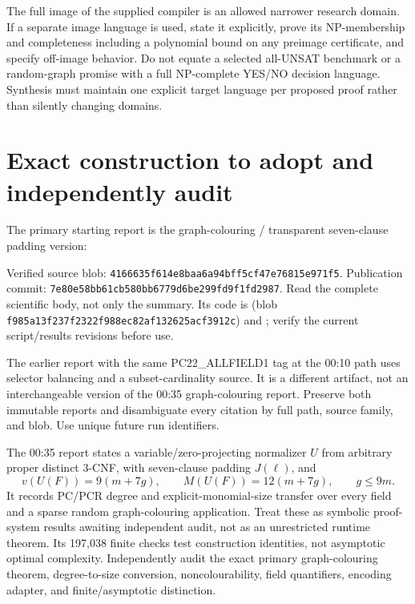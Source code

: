 \documentclass[11pt]{article}
\begin{document}
The full image of the supplied compiler is an allowed narrower research domain. If a separate image language is used, state it explicitly, prove its NP-membership and completeness including a polynomial bound on any preimage certificate, and specify off-image behavior. Do not equate a selected all-UNSAT benchmark or a random-graph promise with a full NP-complete YES/NO decision language. Synthesis must maintain one explicit target language per proposed proof rather than silently changing domains.

\section{Exact construction to adopt and independently audit}
The primary starting report is the graph-colouring / transparent seven-clause padding version:
\begin{quote}\small
{}
\end{quote}
Verified source blob: \texttt{4166635f614e8baa6a94bff5cf47e76815e971f5}.
Publication commit: \texttt{7e80e58bb61cb580bb6779d6be299fd9f1fd2987}.
Read the complete scientific body, not only the summary. Its code is
 (blob \texttt{f985a13f237f2322f988ec82af132625acf3912c}) and
; verify the current script/results revisions before use.

The earlier report with the same PC22\_ALLFIELD1 tag at the 00:10 path uses selector balancing and a subset-cardinality source. It is a different artifact, not an interchangeable version of the 00:35 graph-colouring report. Preserve both immutable reports and disambiguate every citation by full path, source family, and blob. Use unique future run identifiers.

The 00:35 report states a variable/zero-projecting normalizer $U$ from arbitrary proper distinct 3-CNF, with seven-clause padding $J(\ell)$, and
\[
 v(U(F))=9(m+7g),\qquad M(U(F))=12(m+7g),\qquad g\le9m.
\]
It records PC/PCR degree and explicit-monomial-size transfer over every field and a sparse random graph-colouring application. Treat these as symbolic proof-system results awaiting independent audit, not as an unrestricted runtime theorem. Its 197,038 finite checks test construction identities, not asymptotic optimal complexity. Independently audit the exact primary graph-colouring theorem, degree-to-size conversion, noncolourability, field quantifiers, encoding adapter, and finite/asymptotic distinction.
\end{document}
